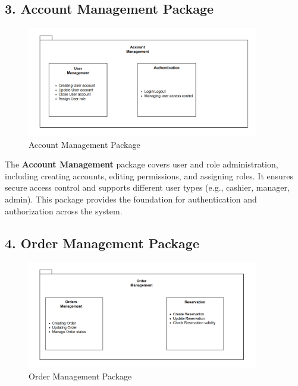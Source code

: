 \documentclass[11pt,a4paper,pdftex]{article}
\begin{document}
\subsection{3. Account Management Package}

\begin{figure}[H]
    \centering
    \includegraphics[width=0.9\textwidth]{graphics/Package3.png}
    \caption{Account Management Package}
    \label{fig:package3}
\end{figure}

The \textbf{Account Management} package covers user and role administration, including creating accounts, editing permissions, and assigning roles. 
It ensures secure access control and supports different user types (e.g., cashier, manager, admin). 
This package provides the foundation for authentication and authorization across the system.

\subsection{4. Order Management Package}

\begin{figure}[H]
    \centering
    \includegraphics[width=0.9\textwidth]{graphics/Package4.png}
    \caption{Order Management Package}
    \label{fig:package4}
\end{figure}
\end{document}
